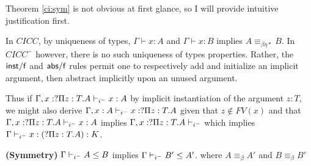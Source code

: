 Theorem \ref{ci:sym} is not obvious at first glance, 
so I will provide intuitive justification first.

In $CICC$, by uniqueness of types, 
$\Gamma \vdash x : A$ and 
$\Gamma \vdash x : B$ implies
$A \equiv_{\beta\eta*} B$.  
In $CICC^{-}$ however, there is no such uniqueness of 
types properties.  
Rather, the $\mathsf{inst/f}$ and $\mathsf{abs/f}$ 
rules permit one to respectively
add and initialize an implicit argument, then
abstract implicitly upon an unused argument. 

Thus if $\Gamma , x : ?\Pi z : T . A \vdash_{i^-} x : A$
by implicit instantiation of the argument $z:T$,
we might also
derive
$\Gamma , x : A \vdash_{i^-} x : ?\Pi z : T . A$
given that $z \notin FV(x)$ and that 
$\Gamma , x : ?\Pi z : T . A \vdash_{i^-} x : A$ 
implies $ \Gamma , x : ?\Pi z : T . A \vdash_{i^-}$ 
which implies $ \Gamma\vdash_{i^-} x : (?\Pi z : T . A) : K$.

\begin{theorem}
\textbf{(Symmetry)}
$\Gamma \vdash_{i^-} A \leq B $ implies 
$\Gamma \vdash_{i^-} B' \leq A' $. where $A \equiv_{\beta} A'$ and $B \equiv_{\beta} B'$
\label{ci:sym}
\end{theorem}

